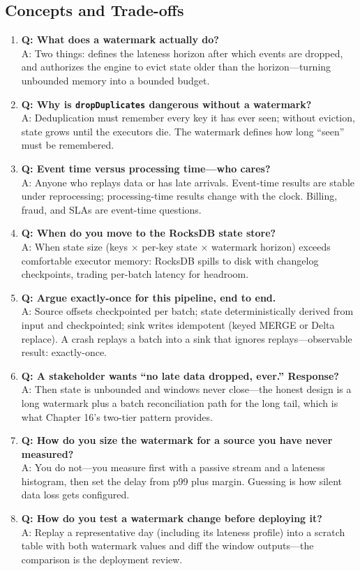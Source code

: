 \subsection{Concepts and Trade-offs}
\begin{enumerate}
    \item \textbf{Q: What does a watermark actually do?}\\
    A: Two things: defines the lateness horizon after which events are dropped, and authorizes the engine to evict state older than the horizon---turning unbounded memory into a bounded budget.
    \item \textbf{Q: Why is \texttt{dropDuplicates} dangerous without a watermark?}\\
    A: Deduplication must remember every key it has ever seen; without eviction, state grows until the executors die. The watermark defines how long ``seen'' must be remembered.
    \item \textbf{Q: Event time versus processing time---who cares?}\\
    A: Anyone who replays data or has late arrivals. Event-time results are stable under reprocessing; processing-time results change with the clock. Billing, fraud, and SLAs are event-time questions.
    \item \textbf{Q: When do you move to the RocksDB state store?}\\
    A: When state size (keys $\times$ per-key state $\times$ watermark horizon) exceeds comfortable executor memory: RocksDB spills to disk with changelog checkpoints, trading per-batch latency for headroom.
    \item \textbf{Q: Argue exactly-once for this pipeline, end to end.}\\
    A: Source offsets checkpointed per batch; state deterministically derived from input and checkpointed; sink writes idempotent (keyed MERGE or Delta replace). A crash replays a batch into a sink that ignores replays---observable result: exactly-once.
    \item \textbf{Q: A stakeholder wants ``no late data dropped, ever.'' Response?}\\
    A: Then state is unbounded and windows never close---the honest design is a long watermark plus a batch reconciliation path for the long tail, which is what Chapter 16's two-tier pattern provides.
    \item \textbf{Q: How do you size the watermark for a source you have never measured?}\\
    A: You do not---you measure first with a passive stream and a lateness histogram, then set the delay from p99 plus margin. Guessing is how silent data loss gets configured.
    \item \textbf{Q: How do you test a watermark change before deploying it?}\\
    A: Replay a representative day (including its lateness profile) into a scratch table with both watermark values and diff the window outputs---the comparison is the deployment review.
\end{enumerate}


